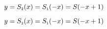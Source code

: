 {$y = S_{\text{\tiny $2$}}(x) =  S_{\text{\tiny $1$}}(-x) = S(-x + 1)$}
{$y = S_{\text{\tiny $2$}}(x) =  S_{\text{\tiny $1$}}(-x) = S(-x + 1)$

}
